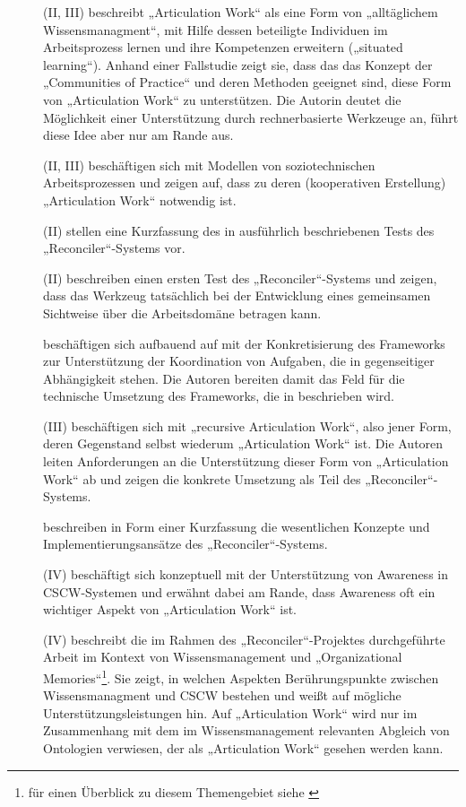 \begin{description}
	\item[\citet{Davenport02}] (II, III) beschreibt „Articulation Work“ als eine Form von „alltäglichem Wissensmanagment“, mit Hilfe dessen beteiligte Individuen im Arbeitsprozess lernen und ihre Kompetenzen erweitern („situated learning“). Anhand einer Fallstudie zeigt sie, dass das das Konzept der „Communities of Practice“ \citep{Wenger98} und deren Methoden geeignet sind, diese Form von „Articulation Work“ zu unterstützen. Die Autorin deutet die Möglichkeit einer Unterstützung durch rechnerbasierte Werkzeuge an, führt diese Idee aber nur am Rande aus.
	\item[\citet{Herrmann02}] (II, III) beschäftigen sich mit Modellen von soziotechnischen Arbeitsprozessen und zeigen auf, dass zu deren (kooperativen Erstellung) „Articulation Work“ notwendig ist. 
	\item[\citet{Mark02}] (II) stellen eine Kurzfassung des in \citep{Mark02a} ausführlich beschriebenen Tests des „Reconciler“-Systems vor.
	\item[\citet{Mark02a}] (II) beschreiben einen ersten Test des „Reconciler“-Systems und zeigen, dass das Werkzeug tatsächlich bei der Entwicklung eines gemeinsamen Sichtweise über die Arbeitsdomäne betragen kann.
	\item[\citet{Raposo02}] beschäftigen sich aufbauend auf \citep{Raposo01} mit der Konkretisierung des Frameworks zur Unterstützung der Koordination von Aufgaben, die in gegenseitiger Abhängigkeit stehen. Die Autoren bereiten damit das Feld für die technische Umsetzung des Frameworks, die in \citep{Raposo04} beschrieben wird.
	\item[\citet{Sarini02}] (III) beschäftigen sich mit „recursive Articulation Work“, also jener Form, deren Gegenstand selbst wiederum „Articulation Work“ ist. Die Autoren leiten Anforderungen an die Unterstützung dieser Form von „Articulation Work“ ab und zeigen die konkrete Umsetzung als Teil des „Reconciler“-Systems.
	\item[\citet{Sarini02a}] beschreiben in Form einer Kurzfassung die wesentlichen Konzepte und Implementierungsansätze des „Reconciler“-Systems.
	\item[\citet{Schmidt02}] (IV) beschäftigt sich konzeptuell mit der Unterstützung von Awareness in \gls{CSCW}-Systemen und erwähnt dabei am Rande, dass Awareness oft ein wichtiger Aspekt von „Articulation Work“ ist.
	\item[\citet{Simone02}] (IV) beschreibt die im Rahmen des „Reconciler“-Projektes durchgeführte Arbeit im Kontext von Wissensmanagement und „Organizational Memories“\footnote{für einen Überblick zu diesem Themengebiet siehe \citep{Maier08}}. Sie zeigt, in welchen Aspekten Berührungspunkte zwischen Wissensmanagment und \gls{CSCW} bestehen und weißt auf mögliche Unterstützungsleistungen hin. Auf „Articulation Work“ wird nur im Zusammenhang mit dem im Wissensmanagement relevanten Abgleich von Ontologien verwiesen, der als „Articulation Work“ gesehen werden kann.

\end{description}
